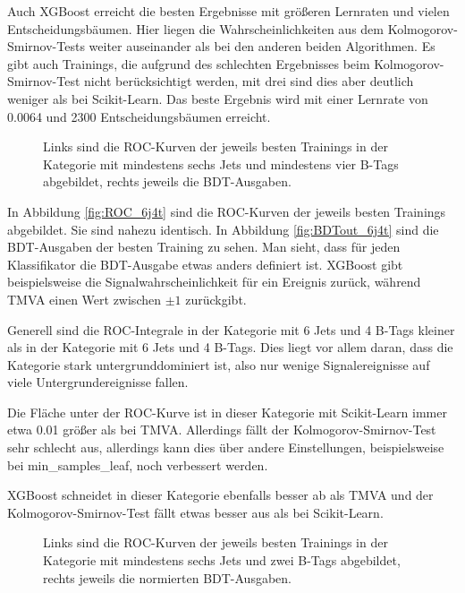 Auch XGBoost erreicht die besten Ergebnisse mit gr\"o\ss eren Lernraten und vielen Entscheidungsb\"aumen. Hier liegen die Wahrscheinlichkeiten aus dem Kolmogorov-Smirnov-Tests weiter auseinander als bei den anderen beiden Algorithmen. Es gibt auch Trainings, die aufgrund des schlechten Ergebnisses beim Kolmogorov-Smirnov-Test nicht ber\"ucksichtigt werden, mit drei sind dies aber deutlich weniger als bei Scikit-Learn. Das beste Ergebnis wird mit einer Lernrate von \num{0,0064} und \num{2300} Entscheidungsb\"aumen erreicht.

\begin{figure}[tbp]
\centering     %
{}
\caption{Links sind die ROC-Kurven der jeweils besten Trainings in der Kategorie mit mindestens sechs Jets und mindestens vier B-Tags abgebildet, rechts jeweils die BDT-Ausgaben.}
\end{figure}

In Abbildung \ref{fig:ROC_6j4t} sind die ROC-Kurven der jeweils besten Trainings abgebildet. Sie sind nahezu identisch. In Abbildung \ref{fig:BDTout_6j4t} sind die BDT-Ausgaben der besten Training zu sehen. Man sieht, dass f\"ur jeden Klassifikator die BDT-Ausgabe etwas anders definiert ist. XGBoost gibt beispielsweise die Signalwahrscheinlichkeit f\"ur ein Ereignis zur\"uck, w\"ahrend TMVA einen Wert zwischen $\pm1$ zur\"uckgibt.

Generell sind die ROC-Integrale in der Kategorie mit 6 Jets und 4 B-Tags kleiner als in der Kategorie mit 6 Jets und 4 B-Tags. Dies liegt vor allem daran, dass die Kategorie stark untergrunddominiert ist, also nur wenige Signalereignisse auf viele Untergrundereignisse fallen.

Die Fl\"ache unter der ROC-Kurve ist in dieser Kategorie mit Scikit-Learn immer etwa \num{0,01} gr\"o\ss er als bei TMVA. Allerdings f\"allt der Kolmogorov-Smirnov-Test sehr schlecht aus, allerdings kann dies \"uber andere Einstellungen, beispielsweise bei min\_samples\_leaf, noch verbessert werden.

XGBoost schneidet in dieser Kategorie ebenfalls besser ab als TMVA und der Kolmogorov-Smirnov-Test f\"allt etwas besser aus als bei Scikit-Learn.

\begin{figure}[tbp]
\centering     %
{}
\caption{Links sind die ROC-Kurven der jeweils besten Trainings in der Kategorie mit mindestens sechs Jets und zwei B-Tags abgebildet, rechts jeweils die normierten BDT-Ausgaben.}
\end{figure}

